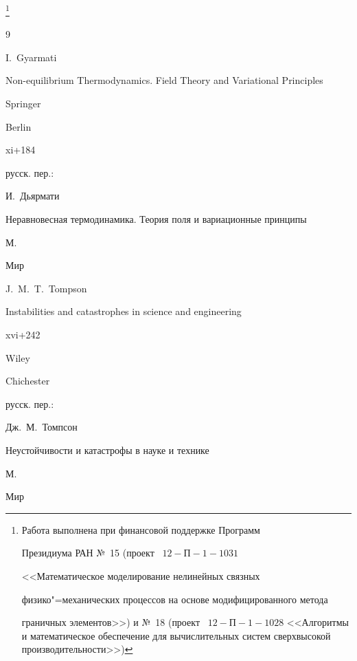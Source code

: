 {\thanks{Работа выполнена при финансовой поддержке Программ

Президиума РАН №~15 (проект \No~$12{-}\text{П}{-}1{-}1031$

<<Математическое моделирование нелинейных связных

физико"=механических процессов на основе модифицированного метода

граничных элементов>>) и №~18 (проект \No~$12{-}\text{П}{-}1{-}1028$ <<Алгоритмы и математическое обеспечение для вычислительных систем сверхвысокой производительности>>)}



\begin{thebibliography}{9}






\by I.~Gyarmati


\book Non-equilibrium Thermodynamics. Field Theory and Variational Principles

\publ Springer

\publaddr Berlin

\totalpages xi+184

\rtransl русск. пер.:~

\by И.~Дьярмати

\book Неравновесная термодинамика. Теория поля и вариационные принципы

\publaddr М.

\publ Мир






\by J.~M.~T.~Tompson

\book Instabilities and catastrophes in science and engineering

\totalpages xvi+242 

\publ  Wiley 


\publaddr Chichester

\rtransl русск. пер.:~

\by Дж.~М.~Томпсон

\book Неустойчивости и катастрофы в науке и технике

\publaddr М.

\publ Мир



\end{thebibliography}}
